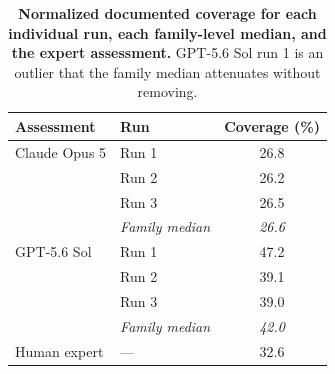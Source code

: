 \begin{table}[H]
\centering
\small
\caption{\textbf{Normalized documented coverage for each individual run, each
family-level median, and the expert assessment.} GPT-5.6 Sol run 1 is an outlier that
the family median attenuates without removing.}
\label{tab:runs}
\begin{tabular}{llc}
\toprule
Assessment & Run & Coverage (\%) \\
\midrule
Claude Opus 5 & Run 1 & 26.8 \\
 & Run 2 & 26.2 \\
 & Run 3 & 26.5 \\
 & \textit{Family median} & \textit{26.6} \\
\addlinespace
GPT-5.6 Sol & Run 1 & 47.2 \\
 & Run 2 & 39.1 \\
 & Run 3 & 39.0 \\
 & \textit{Family median} & \textit{42.0} \\
\addlinespace
Human expert & --- & 32.6 \\
\bottomrule
\end{tabular}
\end{table}
 